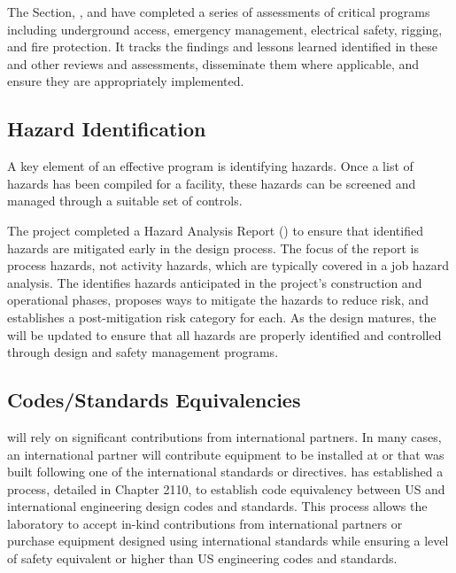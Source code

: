 The \fnal {} Section, , and
  have completed a series of assessments of
critical   programs including underground access,
emergency management, electrical safety, rigging, and fire
protection. It tracks the findings and lessons learned identified in these
 and other reviews and assessments, 
disseminate them where applicable, and ensure they are appropriately implemented.

\subsection{Hazard Identification}
\label{sec:es-tc-eshq-har}

A key element of an effective  program is identifying hazards. 
Once a list of hazards has been compiled for a facility, these hazards can be screened
and managed through a suitable set of controls.

The  project completed a Hazard Analysis Report ()
to ensure that identified hazards are mitigated early in the
design process.  The focus of the report is process hazards,
not activity hazards, which are typically covered in a job hazard
analysis.  The   identifies
hazards anticipated in the project's construction and operational
phases, proposes ways to mitigate the hazards to reduce risk, and establishes a
post-mitigation risk category for each.  As the  design 
matures, the  will be
updated to ensure that all hazards are properly identified and
controlled through design and safety management programs.

\subsection{Codes/Standards Equivalencies}
\label{sec:es-tc-esh_codes}

 will rely on significant contributions from international
partners. In many cases, an international partner will contribute
equipment to be installed at  or  
that was built following one of the
international standards or directives.  has established a
process, detailed in  Chapter 2110, to establish code
equivalency between US and international engineering design codes
and standards. This process allows the laboratory to accept in-kind
contributions from international partners or purchase equipment
designed using international standards while ensuring a level of safety equivalent or
higher than US engineering codes and standards.


